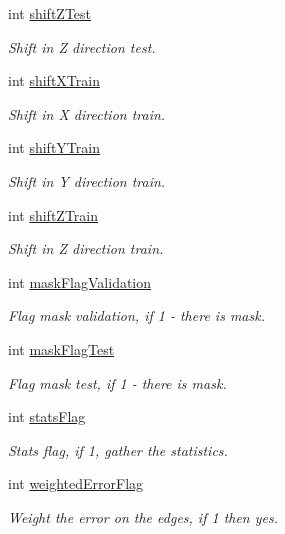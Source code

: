 \begin{DoxyCompactItemize}
int \hyperlink{classParamsInit_af40abf536ea366152b0832bb915f4a9c}{shift\+Z\+Test}
\begin{DoxyCompactList}\small\item\em Shift in Z direction test. \end{DoxyCompactList}\item 
int \hyperlink{classParamsInit_a0e7b7f5e071877b9de571607d1fa0063}{shift\+X\+Train}
\begin{DoxyCompactList}\small\item\em Shift in X direction train. \end{DoxyCompactList}\item 
int \hyperlink{classParamsInit_a189f3eeefe98e0f42003ead7775cd415}{shift\+Y\+Train}
\begin{DoxyCompactList}\small\item\em Shift in Y direction train. \end{DoxyCompactList}\item 
int \hyperlink{classParamsInit_a97c904605860c9b8d9f2c6a7cc037f0d}{shift\+Z\+Train}
\begin{DoxyCompactList}\small\item\em Shift in Z direction train. \end{DoxyCompactList}\item 
int \hyperlink{classParamsInit_add25cddec66c83e2ba79aa31df1ba3a6}{mask\+Flag\+Validation}
\begin{DoxyCompactList}\small\item\em Flag mask validation, if 1 -\/ there is mask. \end{DoxyCompactList}\item 
int \hyperlink{classParamsInit_a18bc89c715b973546c7295e11a14a0c0}{mask\+Flag\+Test}
\begin{DoxyCompactList}\small\item\em Flag mask test, if 1 -\/ there is mask. \end{DoxyCompactList}\item 
int \hyperlink{classParamsInit_aebf6eb0407471bda84bcb1a3c4a0ea12}{stats\+Flag}
\begin{DoxyCompactList}\small\item\em Stats flag, if 1, gather the statistics. \end{DoxyCompactList}\item 
int \hyperlink{classParamsInit_ac98a22ad5adfcef9d3ac4f56e25dc8ca}{weighted\+Error\+Flag}
\begin{DoxyCompactList}\small\item\em Weight the error on the edges, if 1 then yes. \end{DoxyCompactList}\item 

\end{DoxyCompactItemize}
